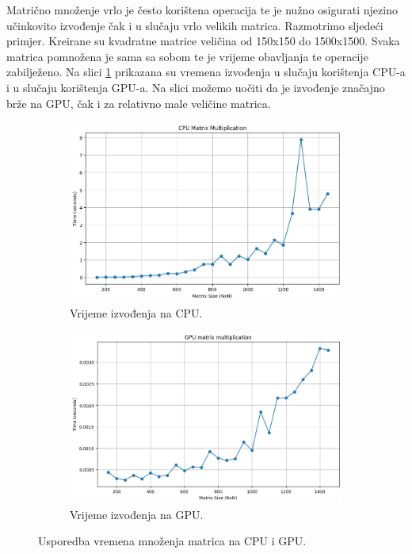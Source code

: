 \documentclass[a4paper,twocolumn]{article}
\begin{document}
		Matrično množenje vrlo je često korištena operacija te je nužno osigurati njezino učinkovito izvođenje čak i u slučaju vrlo velikih matrica. Razmotrimo sljedeći primjer. Kreirane su kvadratne matrice veličina od 150x150 do 1500x1500. Svaka matrica pomnožena je sama sa sobom te je vrijeme obavljanja te operacije zabilježeno. Na slici \ref{fig:cpu_gpu_comparison} prikazana su vremena izvođenja u slučaju korištenja CPU-a i u slučaju korištenja GPU-a. Na slici možemo uočiti da je izvođenje značajno brže na GPU, čak i za relativno male veličine matrica.
		
		\begin{figure}[H]
			\centering
			\begin{subfigure}{0.45\textwidth}
				\centering
				\includegraphics[width=\linewidth]{slike/cpu_mat_mul.png}
				\caption{Vrijeme izvođenja na CPU.}
			\end{subfigure}
			\hfill
			\begin{subfigure}{0.45\textwidth}
				\centering
				\includegraphics[width=\linewidth]{slike/gpu_mat_mul.png}
				\caption{Vrijeme izvođenja na GPU.}
			\end{subfigure}
			\caption{Usporedba vremena množenja matrica na CPU i GPU.}
			\label{fig:cpu_gpu_comparison}
		\end{figure}
\end{document}
